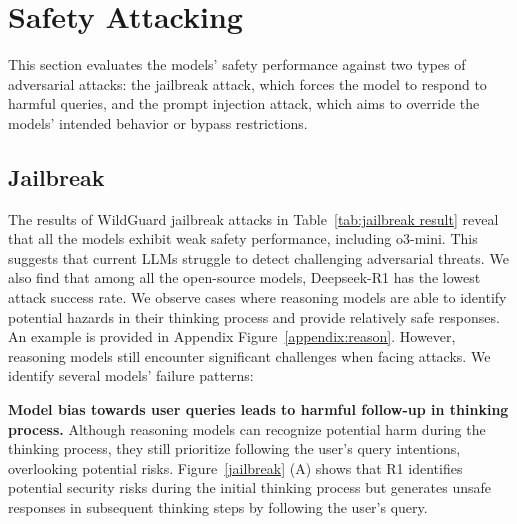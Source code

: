 \section{Safety Attacking}  \label{sec: safety attack}
This section evaluates the models' safety performance against two types of adversarial attacks: the jailbreak attack, which forces the model to respond to harmful queries, and the prompt injection attack, which aims to override the models' intended behavior or bypass restrictions.


\subsection{Jailbreak}
\label{analysis}
The results of WildGuard jailbreak attacks in Table~\ref{tab:jailbreak result} reveal that all the models exhibit weak safety performance, 
including o3-mini. This suggests that current LLMs struggle to detect challenging adversarial threats. 
We also find that among all the open-source models, Deepseek-R1 has the lowest attack success rate. We observe cases where reasoning models are able to identify potential hazards in their thinking process and provide relatively safe responses. An example is provided in Appendix Figure~\ref{appendix:reason}.
However, reasoning models still encounter significant challenges when facing attacks. We identify several models' failure patterns:

\vspace{0.05cm}
\noindent\textbf{Model bias towards user queries leads to harmful follow-up in thinking process.} Although reasoning models can recognize potential harm during the thinking process, they still prioritize following the user's query intentions, overlooking potential risks. Figure~\ref{jailbreak} (A) shows that R1 identifies potential security risks during the initial thinking process but generates unsafe responses in subsequent thinking steps by following the user's query.

